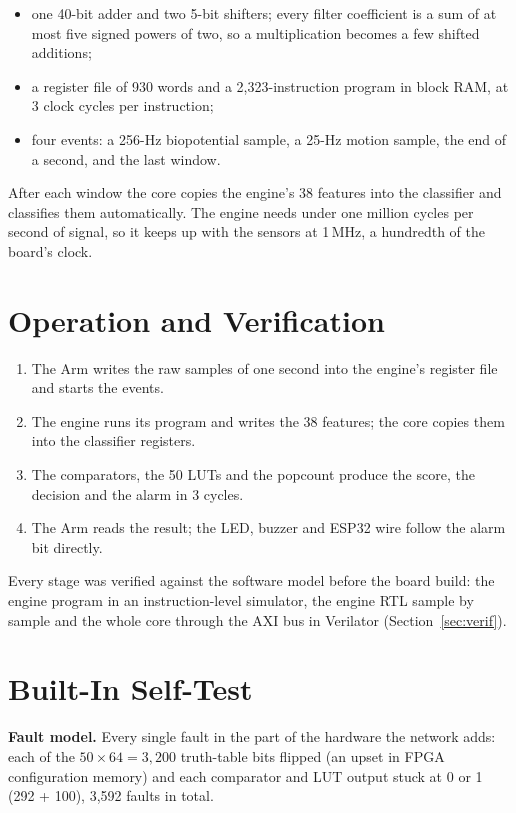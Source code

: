 \begin{itemize}
\item one 40-bit adder and two 5-bit shifters; every filter coefficient is a sum of at most five signed powers of
  two, so a multiplication becomes a few shifted additions;
\item a register file of 930 words and a 2,323-instruction program in block RAM, at 3 clock cycles per instruction;
\item four events: a 256-Hz biopotential sample, a 25-Hz motion sample, the end of a second, and the last window.
\end{itemize}

After each window the core copies the engine's 38 features into the classifier and classifies them automatically. The
engine needs under one million cycles per second of signal, so it keeps up with the sensors at 1\,MHz, a hundredth of
the board's clock.

\section{Operation and Verification}

\begin{enumerate}
\item The Arm writes the raw samples of one second into the engine's register file and starts the events.
\item The engine runs its program and writes the 38 features; the core copies them into the classifier registers.
\item The comparators, the 50 LUTs and the popcount produce the score, the decision and the alarm in 3 cycles.
\item The Arm reads the result; the LED, buzzer and ESP32 wire follow the alarm bit directly.
\end{enumerate}

Every stage was verified against the software model before the board build: the engine program in an
instruction-level simulator, the engine RTL sample by sample and the whole core through the AXI bus in Verilator
(Section~\ref{sec:verif}).

\section{Built-In Self-Test}\label{sec:bist}

\textbf{Fault model.} Every single fault in the part of the hardware the network adds: each of the $50 \times 64 =
3{,}200$ truth-table bits flipped (an upset in FPGA configuration memory) and each comparator and LUT output stuck at 0
or 1 (292 + 100), 3,592 faults in total.

